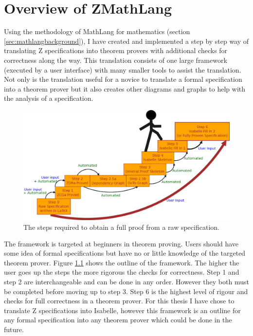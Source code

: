 \chapter{Overview of ZMathLang}
\label{ch:design}

Using the methodology of MathLang for mathematics (section \ref{sec:mathlangbackground}),
I have created and implemented a step by step way of translating Z
specifications into theorem provers with additional checks for correctness along
the way. This translation consists of one large framework (executed by a user
interface) with many smaller tools to assist the translation. Not only is the
translation useful for a novice to translate a formal specification into a
theorem prover but it also creates other diagrams and graphs to help with the
analysis of a specification.

\begin{figure}[H]
 \begin{center}
 \includegraphics [width=12cm]{Figures/Design/mathlangsteps.png}
 \caption{The steps required to obtain a full proof from a raw specification.}
 \label{fig:steps}
\end{center}
\end{figure} 

The framework is targeted at beginners in theorem proving. Users should have
some idea of formal specifications but have no or little knowledge of the
targeted theorem prover. Figure \ref{fig:steps} shows the outline of the
framework. The higher the user goes up the steps the more rigorous the checks
for correctness. Step 1 and step 2 are interchangeable and can be done in any
order. However they both must be completed before moving up to step 3. Step 6 is
the highest level of rigour and checks for full correctness in a theorem prover.
For this thesis I have chose to translate Z specifications into Isabelle,
however this framework is an outline for any formal specification into any
theorem prover which could be done in the future.

